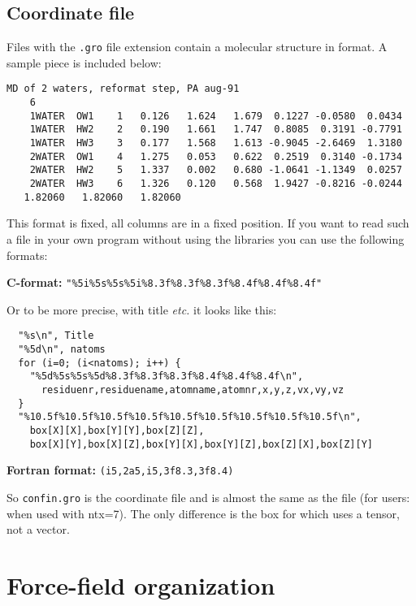 \subsection{Coordinate file}
\label{subsec:grofile}
Files with the {\tt .gro} file extension contain a molecular structure in 
 format. A sample piece is included below:
{\small\begin{verbatim}
MD of 2 waters, reformat step, PA aug-91
    6
    1WATER  OW1    1   0.126   1.624   1.679  0.1227 -0.0580  0.0434
    1WATER  HW2    2   0.190   1.661   1.747  0.8085  0.3191 -0.7791
    1WATER  HW3    3   0.177   1.568   1.613 -0.9045 -2.6469  1.3180
    2WATER  OW1    4   1.275   0.053   0.622  0.2519  0.3140 -0.1734
    2WATER  HW2    5   1.337   0.002   0.680 -1.0641 -1.1349  0.0257
    2WATER  HW3    6   1.326   0.120   0.568  1.9427 -0.8216 -0.0244
   1.82060   1.82060   1.82060
\end{verbatim}}
This format is fixed, {\ie} all columns are in a fixed position. If you
want to read such a file in your own program without using the
{\gromacs} libraries you can use the following formats:

{\bf C-format:} \verb'"%5i%5s%5s%5i%8.3f%8.3f%8.3f%8.4f%8.4f%8.4f"'

Or to be more precise, with title {\em etc.} it looks like this:
\begin{verbatim}
  "%s\n", Title
  "%5d\n", natoms
  for (i=0; (i<natoms); i++) {
    "%5d%5s%5s%5d%8.3f%8.3f%8.3f%8.4f%8.4f%8.4f\n",
      residuenr,residuename,atomname,atomnr,x,y,z,vx,vy,vz
  }
  "%10.5f%10.5f%10.5f%10.5f%10.5f%10.5f%10.5f%10.5f%10.5f\n",
    box[X][X],box[Y][Y],box[Z][Z],
    box[X][Y],box[X][Z],box[Y][X],box[Y][Z],box[Z][X],box[Z][Y]
\end{verbatim}

{\bf Fortran format:} \verb'(i5,2a5,i5,3f8.3,3f8.4)'

So {\tt confin.gro} is the {\gromacs} coordinate file and is almost
the same as the  file (for {\gromos} users: when used with
ntx=7).  The only difference is the box for which {\gromacs} uses a
tensor, not a vector.

\section{Force-field organization }
\label{sec:fforganization}


